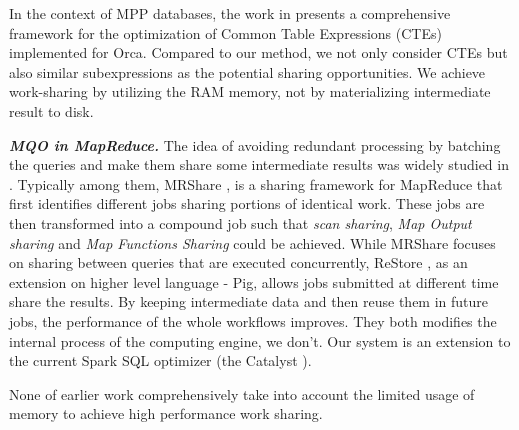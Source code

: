 In the context of MPP databases, the work in \cite{el2015optimization} presents a comprehensive framework for the optimization of Common Table Expressions (CTEs) implemented for Orca. Compared to our method, we not only consider CTEs but also similar subexpressions as the potential sharing opportunities. We achieve work-sharing by utilizing the RAM memory, not by materializing intermediate result to disk.

\emph{\textbf{MQO in MapReduce.}} The idea of avoiding redundant processing by batching the queries and make them share some intermediate results was widely studied in \cite{mrshare, mqo, agrawal2008scheduling, bhatotia2011incoop, elghandour2012restore, silva2012exploiting, li2011platform, li2012scalla}. Typically among them, MRShare \cite{mrshare}, is a sharing framework for MapReduce that first identifies different jobs sharing portions of identical work. These jobs are then transformed into a compound job such that \emph{scan sharing}, \emph{Map Output sharing} and \emph{Map Functions Sharing} could be achieved. While MRShare focuses on sharing between queries that are executed concurrently, ReStore \cite{elghandour2012restore}, as an extension on higher level language - Pig, allows jobs submitted at different time share the results. By keeping intermediate data and then reuse them in future jobs, the performance of the whole workflows improves. They both modifies the internal process of the computing engine, we don't. Our system is an extension to the current Spark SQL optimizer (the Catalyst \cite{sparksql}).

None of earlier work comprehensively take into account the limited usage of memory to achieve high performance work sharing.